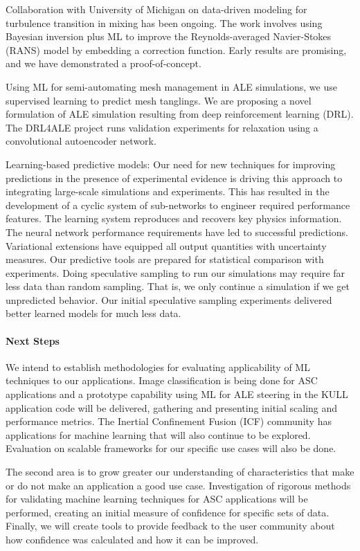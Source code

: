 Collaboration with University of Michigan on data-driven modeling for turbulence transition in mixing has been 
ongoing.  The work involves using Bayesian inversion plus ML to improve the Reynolds-averaged Navier-Stokes (RANS) 
model by embedding a correction function.  Early results are promising, and we have demonstrated a proof-of-concept.

Using ML for semi-automating mesh management in ALE simulations, we use supervised learning to predict mesh tanglings. 
We are proposing a novel formulation of ALE simulation resulting from deep reinforcement learning (DRL).  
The DRL4ALE project runs validation experiments for relaxation using a convolutional autoencoder network.

Learning-based predictive models:  Our need for new techniques for improving predictions in the presence of 
experimental evidence is driving this approach to integrating large-scale simulations and experiments.  This 
has resulted in the development of a cyclic system of sub-networks to engineer required performance features. 
The learning system reproduces and recovers key physics information.  The neural network performance requirements 
have led to successful predictions.  Variational extensions have equipped all output quantities with uncertainty 
measures.  Our predictive tools are prepared for statistical comparison with experiments.  Doing speculative sampling
to run our simulations may require far less data than random sampling.  That is, we only continue a simulation if we 
get unpredicted behavior.  Our initial speculative sampling experiments delivered better learned models for much less data.
  

\paragraph{Next Steps}
We intend to establish methodologies for evaluating applicability of ML techniques to our applications.  
Image classification is being done for ASC applications and a prototype capability using ML for ALE steering 
in the KULL application code will be delivered, gathering and presenting initial scaling and performance metrics.  
The Inertial Confinement Fusion (ICF) community has applications for machine learning that will also continue to be 
explored.  Evaluation on scalable frameworks for our specific use cases will also be done.

The second area is to grow greater our understanding of characteristics that make or do not make an application a good
use case. Investigation of rigorous methods for validating machine learning techniques for ASC applications will be 
performed, creating an initial measure of confidence for specific sets of data.  Finally, we will create tools to 
provide feedback to the user community about how confidence was calculated and how it can be improved.


